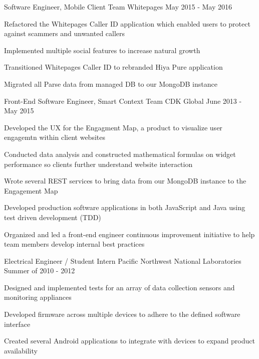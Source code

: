 \begin{cventries}
  \cventry
    {Software Engineer, Mobile Client Team} %
    {Whitepages} %
    {} %
    {May 2015 - May 2016} %
    {
	\begin{cvitems} %
    \item Refactored the Whitepages Caller ID application which enabled users to protect against scammers and unwanted callers
    \item Implemented multiple social features to increase natural growth
    \item Transitioned Whitepages Caller ID to rebranded Hiya Pure application
    \item Migrated all Parse data from managed DB to our MongoDB instance
	\end{cvitems}
    }

  \cventry
    {Front-End Software Engineer, Smart Context Team} %
    {CDK Global} %
    {} %
    {June 2013 - May 2015} %
    {
	\begin{cvitems} %
    \item Developed the UX for the Engagment Map, a product to visualize user engagemtn within client websites
    \item Conducted data analysis and constructed mathematical formulas on widget performance so clients further understand website interaction
    \item Wrote several REST services to bring data from our MongoDB instance to the Engagement Map
    \item Developed production software applications in both JavaScript and Java using test driven development (TDD)
    \item Organized and led a front-end engineer continuous improvement initiative to help team members develop internal best practices
	\end{cvitems}
    }
    
  \cventry
    {Electrical Engineer / Student Intern} %
    {Pacific Northwest National Laboratories} %
    {} %
    {Summer of 2010 - 2012} %
    {
	\begin{cvitems} %
    \item Designed and implemented tests for an array of data collection sensors and monitoring appliances
    \item Developed firmware across multiple devices to adhere to the defined software interface
    \item Created several Android applications to integrate with devices to expand product availability
	\end{cvitems}
    }


\end{cventries}
